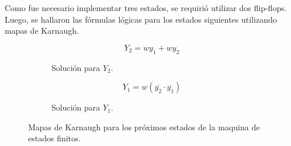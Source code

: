Como fue necesario implementar tres estados, se requirió utilizar dos flip-flops. Luego, se hallaron las fórmulas lógicas para los estados siguientes utilizando mapas de Karnaugh.
\begin{figure}[H]
\begin{subfigure}{0.49\textwidth}
\begin{centering}
    \begin{Karnaughvuit}
        
        
    \end{Karnaughvuit}
\par\end{centering}

\begin{equation*}
Y_2 = wy_1+wy_2
\end{equation*}
\begin{table}[H]
\caption{Solución para $Y_2.$}
\label{mapa:Y2}
\end{table}
\end{subfigure}
\begin{subfigure}{0.49\textwidth}
\begin{centering}
    \begin{Karnaughvuit}
        
        
    \end{Karnaughvuit}
\par\end{centering}
\begin{equation*}
Y_1 = w(\overline{y_2}\cdot \overline{y_1})
\end{equation*}
\begin{table}[H]
\caption{Solución para $Y_1.$}
\label{mapa:Y1}
\end{table}
\end{subfigure}
\caption{Mapas de Karnaugh para los próximos estados de la maquina de estados finitos.}
\end{figure}

